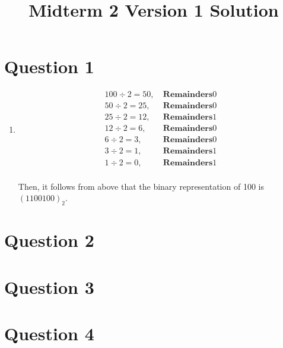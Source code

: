 \documentclass[12pt]{article}
\begin{document}
\title{Midterm 2 Version 1 Solution}
\maketitle

\section*{Question 1}
\begin{enumerate}
    \item

    \begin{align*}
        100 \div 2 = 50,\:&\textbf{Remainders} 0\\
        50 \div 2 = 25,\:&\textbf{Remainders} 0\\
        25 \div 2 = 12,\:&\textbf{Remainders} 1\\
        12 \div 2 = 6,\:&\textbf{Remainders} 0\\
        6 \div 2 = 3,\:&\textbf{Remainders} 0\\
        3 \div 2 = 1,\:&\textbf{Remainders} 1\\
        1 \div 2 = 0,\:&\textbf{Remainders} 1\\
    \end{align*}

    \bigskip

    Then, it follows from above that the binary representation of 100 is $(1100100)_2$.
\end{enumerate}

\section*{Question 2}

\section*{Question 3}

\section*{Question 4}
\end{document}
